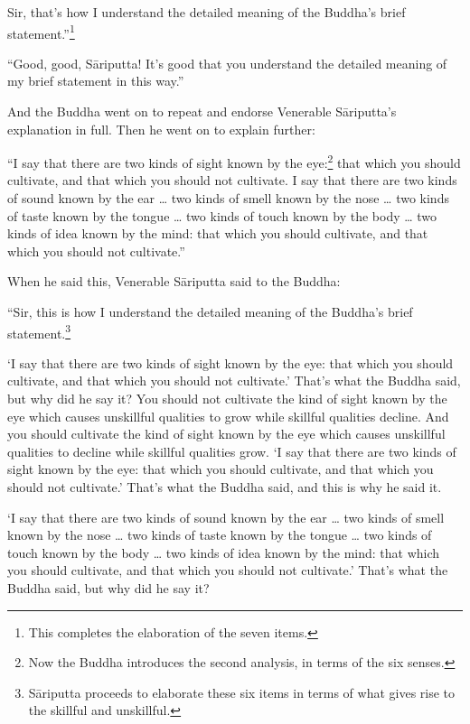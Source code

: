 \documentclass[12pt,openany]{book}%
\begin{document}
Sir, that’s how I understand the detailed meaning of the Buddha’s brief statement.”\footnote{This completes the elaboration of the seven items. } 

“Good, good, \textsanskrit{Sāriputta}! It’s good that you understand the detailed meaning of my brief statement in this way.” 

And the Buddha went on to repeat and endorse Venerable \textsanskrit{Sāriputta}’s explanation in full. Then he went on to explain further: 

“I say that there are two kinds of sight known by the eye:\footnote{Now the Buddha introduces the second analysis, in terms of the six senses. } that which you should cultivate, and that which you should not cultivate. I say that there are two kinds of sound known by the ear … two kinds of smell known by the nose … two kinds of taste known by the tongue … two kinds of touch known by the body … two kinds of idea known by the mind: that which you should cultivate, and that which you should not cultivate.” 

When he said this, Venerable \textsanskrit{Sāriputta} said to the Buddha: 

“Sir, this is how I understand the detailed meaning of the Buddha’s brief statement.\footnote{\textsanskrit{Sāriputta} proceeds to elaborate these six items in terms of what gives rise to the skillful and unskillful. } 

‘I say that there are two kinds of sight known by the eye: that which you should cultivate, and that which you should not cultivate.’ That’s what the Buddha said, but why did he say it? You should not cultivate the kind of sight known by the eye which causes unskillful qualities to grow while skillful qualities decline. And you should cultivate the kind of sight known by the eye which causes unskillful qualities to decline while skillful qualities grow. ‘I say that there are two kinds of sight known by the eye: that which you should cultivate, and that which you should not cultivate.’ That’s what the Buddha said, and this is why he said it. 

‘I say that there are two kinds of sound known by the ear … two kinds of smell known by the nose … two kinds of taste known by the tongue … two kinds of touch known by the body … two kinds of idea known by the mind: that which you should cultivate, and that which you should not cultivate.’ That’s what the Buddha said, but why did he say it? 
\end{document}
